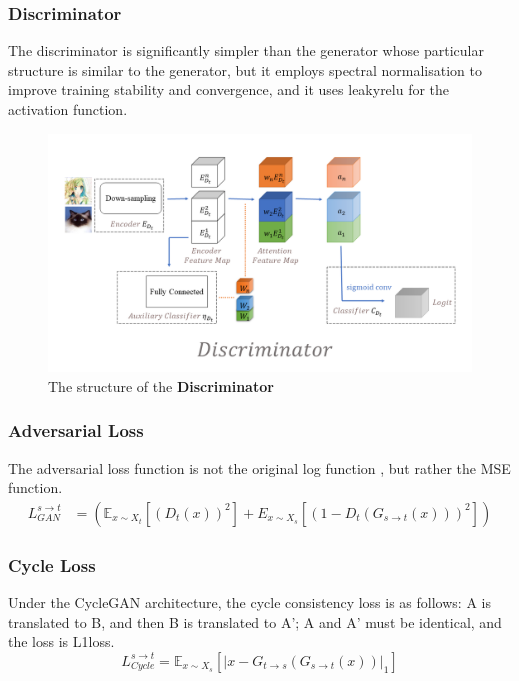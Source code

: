 \documentclass{article}
\begin{document}
\subsubsection{Discriminator}
The discriminator is significantly simpler than the generator whose particular structure is similar to the generator, but it employs spectral normalisation to improve training stability and convergence, and it uses leakyrelu for the activation function.

\begin{figure}
\centerline{\includegraphics[width=1\columnwidth]{Images/Discriminator.png}}\caption{The structure of the \textbf{Discriminator}}
\label{fig:Discriminator}
\end{figure} 

\subsubsection{Adversarial Loss}
The adversarial loss function is not the original log function \cite{Least}, but rather the MSE function.
$$ \begin{aligned} L_{GAN}^{s \rightarrow t} &=\left(\mathbb{E}_{x \sim X_{t}}\left[\left(D_{t}(x)\right)^{2}\right]+E_{x \sim X_{s}}\left[\left(1-D_{t}\left(G_{s \rightarrow t}(x)\right)\right)^{2}\right]\right) \end{aligned} $$ 
\subsubsection{Cycle Loss}
Under the CycleGAN architecture, the cycle consistency loss is as follows: A is translated to B, and then B is translated to A'; A and A' must be identical, and the loss is L1loss.
$$ L_{Cycle}^{s \rightarrow t}=\mathbb{E}_{x \sim X_{s}}\left[\left|x-G_{t \rightarrow s}\left(G_{s \rightarrow t}(x)\right)\right|_{1}\right] $$
\end{document}
